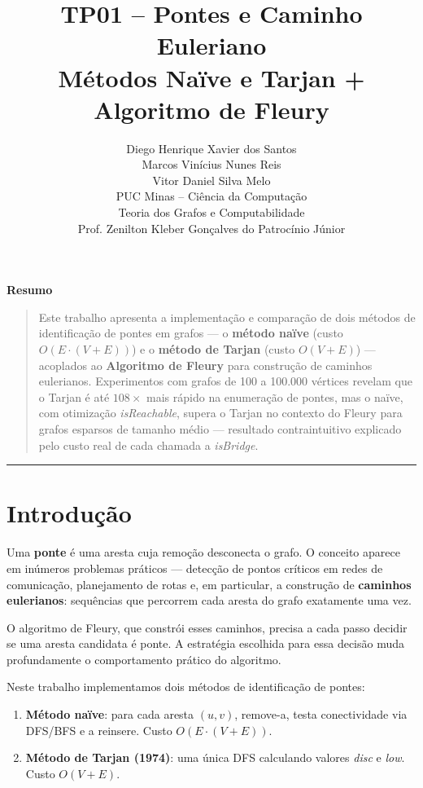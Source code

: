 \documentclass[12pt]{article}
\title{\textbf{TP01 -- Pontes e Caminho Euleriano}\\[0.3em]
\large Métodos Naïve e Tarjan + Algoritmo de Fleury}
\author{
Diego Henrique Xavier dos Santos \\
Marcos Vinícius Nunes Reis \\
Vitor Daniel Silva Melo \\[0.4em]
\small PUC Minas -- Ciência da Computação \\
\small Teoria dos Grafos e Computabilidade \\
\small Prof. Zenilton Kleber Gonçalves do Patrocínio Júnior
}
\date{}
\renewenvironment{abstract}{%
  \small\begin{center}\bfseries Resumo\end{center}%
  \begin{quotation}\noindent
}{%
  \end{quotation}
}
\begin{document}

\maketitle

\begin{abstract}
Este trabalho apresenta a implementação e comparação de dois métodos de
identificação de pontes em grafos --- o \textbf{método naïve}
(custo $O(E \cdot (V{+}E))$) e o \textbf{método de Tarjan}
(custo $O(V{+}E)$) --- acoplados ao \textbf{Algoritmo de Fleury}
para construção de caminhos eulerianos. Experimentos com grafos de 100 a
100.000 vértices revelam que o Tarjan é até $108\times$ mais rápido na
enumeração de pontes, mas o naïve, com otimização \textit{isReachable},
supera o Tarjan no contexto do Fleury para grafos esparsos de tamanho
médio --- resultado contraintuitivo explicado pelo custo real de cada
chamada a \textit{isBridge}.
\end{abstract}

\vspace{1em}
\hrule
\vspace{1.5em}

\section{Introdução}

Uma \textbf{ponte} é uma aresta cuja remoção desconecta o grafo. O conceito
aparece em inúmeros problemas práticos --- detecção de pontos críticos em
redes de comunicação, planejamento de rotas e, em particular, a construção
de \textbf{caminhos eulerianos}: sequências que percorrem cada aresta do
grafo exatamente uma vez.

O algoritmo de Fleury, que constrói esses caminhos, precisa a cada passo
decidir se uma aresta candidata é ponte. A estratégia escolhida para essa
decisão muda profundamente o comportamento prático do algoritmo.

Neste trabalho implementamos dois métodos de identificação de pontes:
\begin{enumerate}
    \item \textbf{Método naïve}: para cada aresta $(u,v)$, remove-a, testa
          conectividade via DFS/BFS e a reinsere. Custo $O(E \cdot (V{+}E))$.
    \item \textbf{Método de Tarjan (1974)}: uma única DFS calculando valores
          \textit{disc} e \textit{low}. Custo $O(V{+}E)$.
\end{enumerate}
\end{document}
